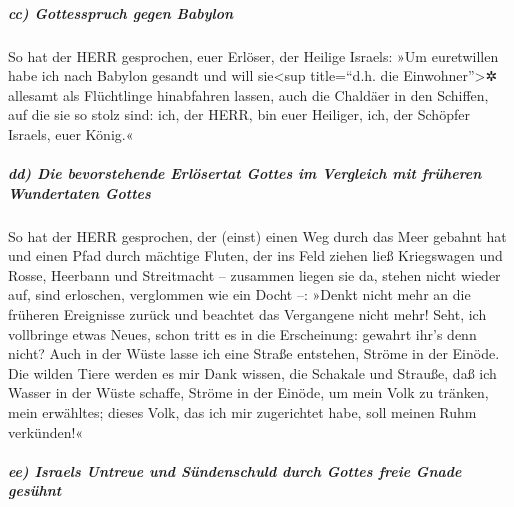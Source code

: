 \hypertarget{cc-gottesspruch-gegen-babylon}{%
\subparagraph{cc) Gottesspruch gegen
Babylon}\label{cc-gottesspruch-gegen-babylon}}

So hat der HERR gesprochen, euer Erlöser, der Heilige
Israels: »Um euretwillen habe ich nach Babylon gesandt und will
sie\textless sup title=``d.h. die Einwohner''\textgreater✲ allesamt als
Flüchtlinge hinabfahren lassen, auch die Chaldäer in den Schiffen, auf
die sie so stolz sind: ich, der HERR, bin euer Heiliger,
ich, der Schöpfer Israels, euer König.«

\hypertarget{dd-die-bevorstehende-erluxf6sertat-gottes-im-vergleich-mit-fruxfcheren-wundertaten-gottes}{%
\subparagraph{dd) Die bevorstehende Erlösertat Gottes im Vergleich mit
früheren Wundertaten
Gottes}\label{dd-die-bevorstehende-erluxf6sertat-gottes-im-vergleich-mit-fruxfcheren-wundertaten-gottes}}

So hat der HERR gesprochen, der (einst) einen Weg durch
das Meer gebahnt hat und einen Pfad durch mächtige Fluten,
der ins Feld ziehen ließ Kriegswagen und Rosse, Heerbann
und Streitmacht -- zusammen liegen sie da, stehen nicht wieder auf, sind
erloschen, verglommen wie ein Docht --: »Denkt nicht mehr
an die früheren Ereignisse zurück und beachtet das Vergangene nicht
mehr! Seht, ich vollbringe etwas Neues, schon tritt es in
die Erscheinung: gewahrt ihr's denn nicht? Auch in der Wüste lasse ich
eine Straße entstehen, Ströme in der Einöde. Die wilden
Tiere werden es mir Dank wissen, die Schakale und Strauße, daß ich
Wasser in der Wüste schaffe, Ströme in der Einöde, um mein Volk zu
tränken, mein erwähltes; dieses Volk, das ich mir
zugerichtet habe, soll meinen Ruhm verkünden!«

\hypertarget{ee-israels-untreue-und-suxfcndenschuld-durch-gottes-freie-gnade-gesuxfchnt}{%
\subparagraph{ee) Israels Untreue und Sündenschuld durch Gottes freie
Gnade
gesühnt}\label{ee-israels-untreue-und-suxfcndenschuld-durch-gottes-freie-gnade-gesuxfchnt}}

